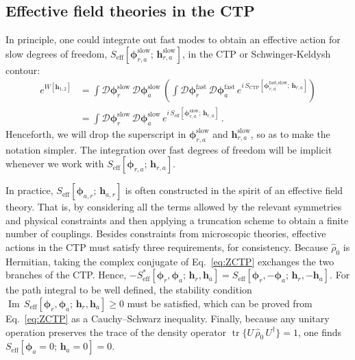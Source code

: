 \documentclass[aps,prd,nofootinbib,amsmath,amssymb,showpacs,longbibliography,singlecolumn,superscriptaddress,notitlepage]{revtex4-1}
\theoremstyle{plain}
\theoremstyle{definition}
\newcommand{\cvec}[1]{\ensuremath{\bm {#1}}}
\newcommand{\tr}{\operatorname{tr}}
\begin{document}
\subsection{Effective field theories in the CTP}

In principle, one could integrate out fast modes to obtain an effective action  for slow degrees of freedom, $S_{\textrm{eff}} [\cvec{\phi}_{r,a}^{\textrm{slow}};\, \cvec{h}_{r,a}^{\textrm{slow}}]$, in the CTP or Schwinger-Keldysh contour:
\begin{align}
    e^{W[\cvec{h}_{1,2}]} 
    &= \int \mathcal{D}\cvec{\phi}_r^{\textrm{slow}} \,\mathcal{D}\cvec{\phi}_a^{\textrm{slow}}\, \left(\int \mathcal{D}\cvec{\phi}_r^{\textrm{fast}} \,\mathcal{D}\cvec{\phi}_a^{\textrm{fast}}\, e^{i\,S_{\textrm{CTP}}[\cvec{\phi}^{\textrm{fast,slow}}_{r,a}; \,\cvec{h}_{r,a}]}\right)
\\
    &=\int \mathcal{D}\cvec{\phi}_r^{\textrm{slow}} \,\mathcal{D}\cvec{\phi}_a^{\textrm{slow}}\, e^{i\,S_{\textrm{eff}}[\cvec{\phi}^{\textrm{slow}}_{r,a};\, \cvec{h}_{r,a}]}\,.
\end{align}
Henceforth, we will drop the superscript in $\cvec{\phi}_{r,a}^{\textrm{slow}}$ and $\cvec{h}_{r,a}^{\textrm{slow}}$, so as to make the notation simpler.  The integration over fast degrees of freedom will be implicit whenever we work with $S_{\textrm{eff}}[\cvec{\phi}_{r,a};\, \cvec{h}_{r,a}]$. 

In practice,  $S_{\textrm{eff}}[\cvec{\phi}_{a,r};\, \cvec{h}_{a,r}]$ is often constructed in the spirit of an effective field theory. That is, by considering all the terms allowed by the relevant symmetries and physical constraints and then applying a truncation scheme to obtain a finite number of couplings. 
Besides constraints from microscopic theories, effective actions in the CTP must satisfy three requirements, for consistency. Because $\hat\rho_0$ is Hermitian, taking the complex conjugate of Eq.~\eqref{eq:ZCTP} exchanges the two branches of the CTP. Hence, $-S_{\textrm{eff}}^*[\cvec{\phi}_r,\cvec{\phi}_a;\,\cvec{h}_r,\cvec{h}_a] = S_{\textrm{eff}}[\cvec{\phi}_r,-\cvec{\phi}_a;\,\cvec{h}_r,-\cvec{h}_a] $. For the path integral to be well defined, the stability condition $\operatorname{Im}
\, S_{\textrm{eff}}[\cvec{\phi}_r,\cvec{\phi}_a;\,\cvec{h}_r,\cvec{h}_a] \geq 0$ must be satisfied, which can be proved from  Eq.~\eqref{eq:ZCTP} as a Cauchy–Schwarz inequality. 
Finally, because any unitary operation preserves the trace of the density operator $\tr\{U \,\hat\rho_0 \,U^\dagger\}=1$, one finds $S_{\textrm{eff}}[\cvec{\phi}_a=0;\,\cvec{h}_a=0]=0$.
\end{document}

